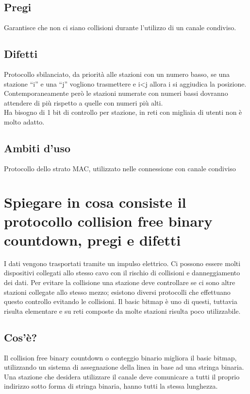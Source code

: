 \subsection{Pregi}
Garantisce che non ci siano collisioni durante l'utilizzo di un canale condiviso.

\subsection{Difetti}
Protocollo sbilanciato, da priorità alle stazioni con un numero basso, se una stazione “i” e una “j” vogliono trasmettere e i<j allora i si aggiudica la posizione.\\
Contemporaneamente però le stazioni numerate con numeri bassi dovranno attendere di più rispetto a quelle con numeri più alti.\\
Ha bisogno di 1 bit di controllo per stazione, in reti con migliaia di utenti non è molto adatto.

\subsection{Ambiti d'uso}
Protocollo dello strato MAC, utilizzato nelle connessione con canale condiviso

\section{Spiegare in cosa consiste il protocollo collision free binary countdown, pregi e difetti}

I dati vengono trasportati tramite un impulso elettrico. Ci possono essere molti dispositivi collegati allo stesso cavo con il rischio di collisioni e danneggiamento dei dati.
Per evitare la collisione una stazione deve controllare se ci sono altre stazioni collegate allo stesso mezzo; esistono diversi protocolli che effettuano questo controllo evitando le collisioni.
Il basic bitmap è uno di questi, tuttavia risulta elementare e su reti composte da molte stazioni risulta poco utilizzabile.

\subsection{Cos'è?}
Il collision free binary countdown o conteggio binario migliora il basic bitmap, utilizzando un sistema di assegnazione della linea in base ad una stringa binaria.
Una stazione che desidera utilizzare il canale deve comunicare a tutti il proprio indirizzo sotto forma di stringa binaria, hanno tutti la stessa lunghezza.

